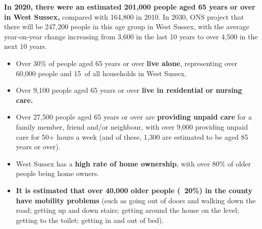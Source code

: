 \begin{tcolorbox}[title={Population aged 65 years or over}, colback={boxcolour}]
    {\bfseries In 2020, there were an estimated 201,000 people aged 65 years or over in West Sussex,} compared with 164,800 in 2010. In 2030, ONS project that there will be 247,200 people in this age group in West Sussex, with the average year-on-year change increasing from 3,600 in the last 10 years to over 4,500 in the next 10 years.
    
    \begin{itemize}[noitemsep]
        \item Over 30\% of people aged 65 years or over {\bfseries live alone}, representing over 60,000 people and 15\ of all households in West Sussex.
        \item Over 9,100 people aged 65 years or over {\bfseries live in residential or nursing care.}
        \item Over 27,500 people aged 65 years or over are {\bfseries providing unpaid care} for a family member, friend and/or neighbour, with over 9,000 providing unpaid care for 50+ hours a week (and of these, 1,300 are estimated to be aged 85 years or over).
        \item West Sussex has a {\bfseries high rate of home ownership}, with over 80\% of older people being home owners.
        \item {\bfseries It is estimated that over 40,000 older people (~20\%) in the county have mobility problems} (such as going out of doors and walking down the road; getting up and down stairs; getting around the house on the level; getting to the toilet; getting in and out of bed).
    \end{itemize}
\end{tcolorbox}

